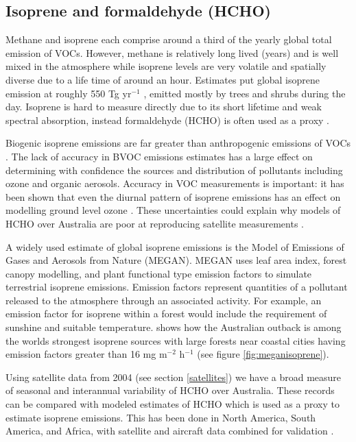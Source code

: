 \subsection{Isoprene and formaldehyde (HCHO)}
\label{proxy}
Methane and isoprene each comprise around a third of the yearly global total emission of VOCs.
However, methane is relatively long lived (years) and is well mixed in the atmosphere while isoprene levels are very volatile and spatially diverse due to a life time of around an hour. Estimates put global isoprene emission at roughly 550 Tg yr$^{−1}$ \cite{Guenther_2006,Monks_2014}, emitted mostly by trees and shrubs during the day.
Isoprene is hard to measure directly due to its short lifetime and weak spectral absorption, instead formaldehyde (HCHO) is often used as a proxy \cite{Marais_2012,bauwens2013satellite}.

Biogenic isoprene emissions are far greater than anthropogenic emissions of VOCs \cite{Guenther_2006}. 
The lack of accuracy in BVOC emissions estimates has a large effect on determining with confidence the sources and distribution of pollutants including ozone and organic aerosols.
Accuracy in VOC measurements is important: it has been shown that even the diurnal pattern of isoprene emissions has an effect on modelling ground level ozone \cite{Hewitt_2011,Fan_2004}.
These uncertainties could explain why models of HCHO over Australia are poor at reproducing satellite measurements \cite{Stavrakou_2008}.

A widely used estimate of global isoprene emissions is the Model of Emissions of Gases and Aerosols from Nature (MEGAN). MEGAN uses leaf area index, forest canopy modelling, and plant functional type emission factors to simulate terrestrial isoprene emissions.
Emission factors represent quantities of a pollutant released to the atmosphere through an associated activity.
For example, an emission factor for isoprene within a forest would include the requirement of sunshine and suitable temperature.
\citet{Guenther_2006} shows how the Australian outback is among the worlds strongest isoprene sources with large forests near coastal cities having emission factors greater than 16 mg m$^{-2}$ h$^{-1}$ (see figure \ref{fig:meganisoprene}).

Using satellite data from 2004 (see section \ref{satellites}) we have a broad measure of seasonal and interannual variability of HCHO over Australia. These records can be compared with modeled estimates of HCHO which is used as a proxy to estimate isoprene emissions. This has been done in North America, South America, and Africa, with satellite and aircraft data combined for validation \cite{Millet_2006, Marais_2014}.

